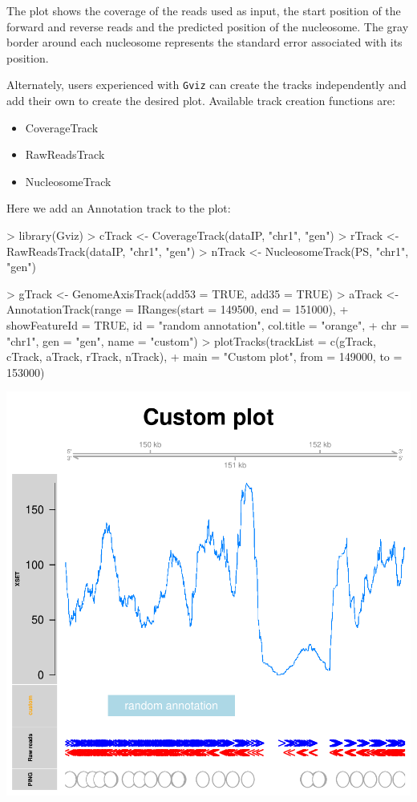 \documentclass[11pt]{article}
\begin{document}
The plot shows the coverage of the reads used as input, the start position of
the forward and reverse reads and the predicted position of the nucleosome. The
gray border around each nucleosome represents the standard error associated with
its position.

Alternately, users experienced with \texttt{Gviz} can create the tracks
independently and add their own to create the desired plot.
Available track creation functions are:
\begin{itemize}
\item CoverageTrack
\item RawReadsTrack
\item NucleosomeTrack
\end{itemize}

Here we add an Annotation track to the plot:
\begin{Schunk}
\begin{Sinput}
> library(Gviz)
> cTrack <- CoverageTrack(dataIP, "chr1", "gen")
> rTrack <- RawReadsTrack(dataIP, "chr1", "gen")
> nTrack <- NucleosomeTrack(PS, "chr1", "gen")
\end{Sinput}
\end{Schunk}

\begin{Schunk}
\begin{Sinput}
> gTrack <- GenomeAxisTrack(add53 = TRUE, add35 = TRUE)
> aTrack <- AnnotationTrack(range = IRanges(start = 149500, end = 151000), 
+     showFeatureId = TRUE, id = "random annotation", col.title = "orange", 
+     chr = "chr1", gen = "gen", name = "custom")
> plotTracks(trackList = c(gTrack, cTrack, aTrack, rTrack, nTrack), 
+     main = "Custom plot", from = 149000, to = 153000)
\end{Sinput}
\end{Schunk}
\includegraphics{PING-Gviz-tracks}
\end{document}
